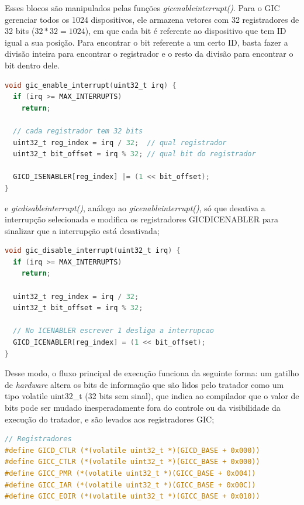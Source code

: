 Esses blocos são manipulados pelas funções \emph{gic\textunderscore{}enable\textunderscore{}interrupt()}. Para o GIC gerenciar todos os 1024 dispositivos, ele armazena vetores com 32 registradores de 32 bits ($32 * 32 = 1024$), em que cada bit é referente ao dispositivo que tem ID igual a sua posição. Para encontrar o bit referente a um certo ID, basta fazer a divisão inteira para encontrar o registrador e o resto da divisão para encontrar o bit dentro dele.
\begin{lstlisting}[language=C]
void gic_enable_interrupt(uint32_t irq) {
  if (irq >= MAX_INTERRUPTS)
    return;

  // cada registrador tem 32 bits
  uint32_t reg_index = irq / 32;  // qual registrador
  uint32_t bit_offset = irq % 32; // qual bit do registrador

  GICD_ISENABLER[reg_index] |= (1 << bit_offset);
}
\end{lstlisting}
e \emph{gic\textunderscore{}disable\textunderscore{}interrupt()}, análogo ao \emph{gic\textunderscore{}enable\textunderscore{}interrupt()}, só que desativa a interrupção selecionada e modifica os registradores GICD\textunderscore{}ICENABLER para sinalizar que a interrupção está desativada;
\begin{lstlisting}[language=C]
void gic_disable_interrupt(uint32_t irq) {
  if (irq >= MAX_INTERRUPTS)
    return;

  uint32_t reg_index = irq / 32;
  uint32_t bit_offset = irq % 32;

  // No ICENABLER escrever 1 desliga a interrupcao
  GICD_ICENABLER[reg_index] = (1 << bit_offset);
}
\end{lstlisting}

Desse modo, o fluxo principal de execução funciona da seguinte forma: um gatilho de \emph{hardware} altera os bits de informação que são lidos pelo tratador como um tipo volatile uint32\_t (32 bits sem sinal), que indica ao compilador que o valor de bits pode ser mudado inesperadamente fora do controle ou da visibilidade da execução do tratador, e são levados aos registradores GIC;
\begin{lstlisting}[language=C]
// Registradores
#define GICD_CTLR (*(volatile uint32_t *)(GICD_BASE + 0x000))
#define GICC_CTLR (*(volatile uint32_t *)(GICC_BASE + 0x000))
#define GICC_PMR (*(volatile uint32_t *)(GICC_BASE + 0x004))
#define GICC_IAR (*(volatile uint32_t *)(GICC_BASE + 0x00C))
#define GICC_EOIR (*(volatile uint32_t *)(GICC_BASE + 0x010))
\end{lstlisting}


